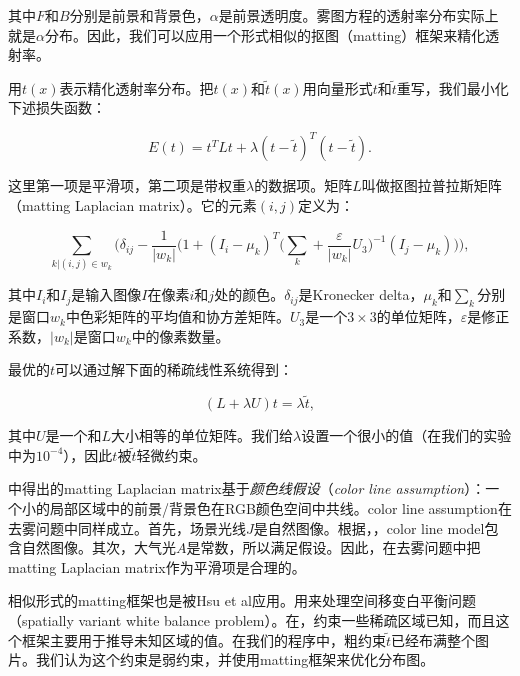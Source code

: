 \documentclass{ctexart}
\begin{document}
其中$F$和$B$分别是前景和背景色，$\alpha$是前景透明度。雾图方程的透射率分布实际上就是$\alpha$分布。因此，我们可以应用一个形式相似的抠图（matting）\cite{LevinLischinskiWeiss2006}框架来精化透射率。\par

用$t(x)$表示精化透射率分布。把$t(x)$和$\tilde{t}(x)$用向量形式$t$和$\tilde{t}$重写，我们最小化下述损失函数：

\begin{equation}\label{equ:15}
	E(t) = t^TLt + \lambda(t-\tilde{t})^T(t-\tilde{t}).
\end{equation}

这里第一项是平滑项，第二项是带权重$\lambda$的数据项。矩阵$L$叫做抠图拉普拉斯矩阵（matting Laplacian matrix）\cite{LevinLischinskiWeiss2006}。它的元素$(i, j)$定义为：

\begin{equation}\label{equ:16}
	\sum_{k | (i, j) \in w_k}\Big(
	\delta_{ij} - \frac{1}{|w_k|} \Big(
	1 + (I_i - \mu_k)^T \big(\sum_k + \frac{\varepsilon}{|w_k|}U_3\big)^{-1} (I_j - \mu_k)
	\Big)
	\Big),
\end{equation}

其中$I_i$和$I_j$是输入图像$I$在像素$i$和$j$处的颜色。$\delta_{ij}$是Kronecker delta，$\mu_k$和$\sum_k$分别是窗口$w_k$中色彩矩阵的平均值和协方差矩阵。$U_3$是一个$3 \times 3$的单位矩阵，$\varepsilon$是修正系数，$|w_k|$是窗口$w_k$中的像素数量。\par

最优的$t$可以通过解下面的稀疏线性系统得到：

\begin{equation}\label{equ:17}
	(L + \lambda U)t = \lambda \tilde{t},
\end{equation}

其中$U$是一个和$L$大小相等的单位矩阵。我们给$\lambda$设置一个很小的值（在我们的实验中为$10^{-4}$），因此$t$被$\tilde{t}$轻微约束。\par

\cite{LevinLischinskiWeiss2006}中得出的matting Laplacian matrix基于\emph{颜色线假设}（\emph{color line assumption}）：一个小的局部区域中的前景/背景色在RGB颜色空间中共线。color line assumption在去雾问题中同样成立。首先，场景光线$J$是自然图像。根据\cite{LevinLischinskiWeiss2006}，\cite{OmerWerman2004}，color line model包含自然图像。其次，大气光$A$是常数，所以满足假设。因此，在去雾问题中把matting Laplacian matrix作为平滑项是合理的。\par

相似形式的matting框架也是被Hsu et al应用。\cite{HsuMertensParisAvidanDurand2008}用来处理空间移变白平衡问题（spatially variant white balance problem）。在\cite{LevinLischinskiWeiss2006}，\cite{HsuMertensParisAvidanDurand2008}约束一些稀疏区域已知，而且这个框架主要用于推导未知区域的值。在我们的程序中，粗约束$\tilde{t}$已经布满整个图片。我们认为这个约束是弱约束，并使用matting框架来优化分布图。\par
\end{document}

